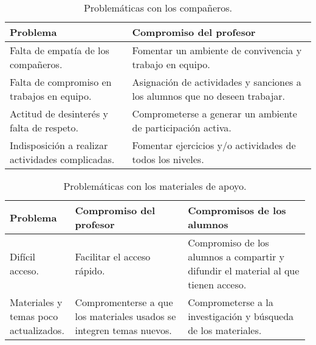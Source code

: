 \documentclass[12pt]{report}
\newcounter{it}
\theoremstyle{largebreak}
\begin{document}
    \begin{table}[ht]
        \begin{center}
            \begin{tabular}{p{0.4\linewidth} | p{0.6\linewidth}}
                \hline
                \hline
                Problema & Compromiso del profesor \\
                \hline
                \hline
                Falta de empatía de los compañeros. & Fomentar un ambiente de convivencia y trabajo en equipo. \\
                \hline
                Falta de compromiso en trabajos en equipo. & Asignación de actividades y sanciones a los alumnos que no deseen trabajar.\\ 
                \hline
                Actitud de desinterés y falta de respeto. & Comprometerse a generar un ambiente de participación activa. \\
                \hline
                Indisposición a realizar actividades complicadas. & Fomentar ejercicios y/o actividades de todos los niveles. \\ 
                \hline
            \end{tabular}
            \caption{Problemáticas con los compañeros.}
        \end{center}
    \end{table}

    \begin{table}[h]
        \begin{center}
            \begin{tabular}{p{0.2\linewidth} | p{0.375\linewidth} | p{0.4\linewidth}}
                \hline
                \hline
                Problema & Compromiso del profesor & Compromisos de los alumnos \\
                \hline
                \hline
                Difícil acceso. & Facilitar el acceso rápido. & Compromiso de los alumnos a compartir y difundir el material al que tienen acceso. \\
                Materiales y temas poco actualizados. & Compromenterse a que los materiales usados se integren temas nuevos. & Comprometerse a la investigación y búsqueda de los materiales.\\
            \end{tabular}
            \caption{Problemáticas con los materiales de apoyo.}
        \end{center}
    \end{table}
\end{document}

